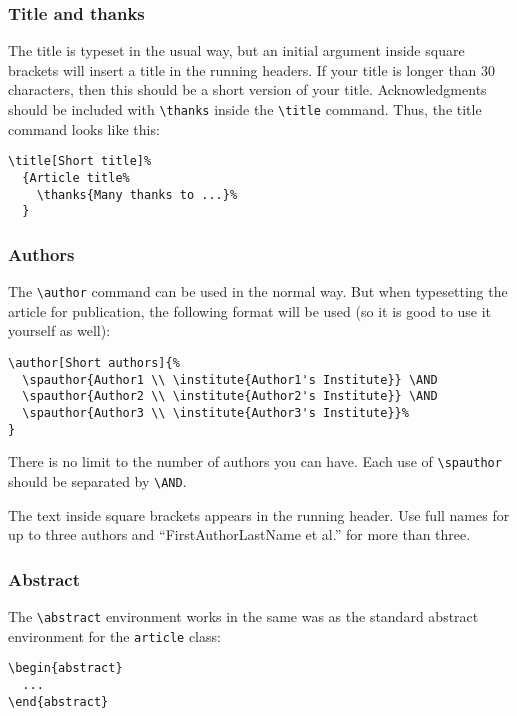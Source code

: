 \documentclass[lucida,final]{sp}
\newcommand{\spcode}[1]{\texttt{#1}}
\newcommand{\cmd}[1]{\texttt{\textbackslash#1}}
\begin{document}
\subsubsection{Title and thanks}

The title is typeset in the usual way, but an initial argument inside
square brackets will insert a title in the running headers.  If your
title is longer than 30 characters, then this should be a short
version of your title.  Acknowledgments should be included with
\cmd{thanks} inside the \cmd{title} command.  Thus, the title command
looks like this:
%
\begin{Verbatim}
\title[Short title]%
  {Article title%
    \thanks{Many thanks to ...}%
  }
\end{Verbatim}


\subsubsection{Authors}

The \cmd{author} command can be used in the normal way.  But when
typesetting the article for publication, the following format will
be used (so it is good to use it yourself as well):
%
\begin{Verbatim}
\author[Short authors]{%
  \spauthor{Author1 \\ \institute{Author1's Institute}} \AND
  \spauthor{Author2 \\ \institute{Author2's Institute}} \AND
  \spauthor{Author3 \\ \institute{Author3's Institute}}%
}
\end{Verbatim}
%
There is no limit to the number of authors you can have.  Each use of
\cmd{spauthor} should be separated by \cmd{AND}.

The text inside square brackets appears in the running header. Use
full names for up to three authors and ``FirstAuthorLastName et al.''
for more than three.


\subsubsection{Abstract}

The \cmd{abstract} environment works in the same was as the standard
abstract environment for the \spcode{article} class:
%
\begin{Verbatim}
\begin{abstract}
  ...
\end{abstract}
\end{Verbatim}
\end{document}
